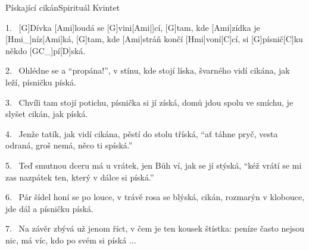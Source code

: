 %
\begin{song}{Pískající cikán}{Spirituál Kvintet}

\begin{xverse}{1.~}
[G]Dívka [Ami]loudá se [G]vini[Ami|]{cí,} [G]tam, kde [Ami]zídka je [Hmi_]{níz}[Ami]{ká},
[G]tam, kde [Ami]stráň končí [Hmi]voní[C]cí, si [G]písnič[C]ku někdo [GC_]{pí}[D]{ská}.
\end{xverse}

\begin{xverse}{2.~}
Ohlédne se a ``propána!'', v stínu, kde stojí líska,
švarného vidí cikána, jak leží, písničku píská.
\end{xverse}


\begin{xverse}{3.~}
Chvíli tam stojí potichu, písnička si jí získá,
domů jdou spolu ve smíchu, je slyšet cikán, jak píská.
\end{xverse}


\begin{xverse}{4.~}
Jenže tatík, jak vidí cikána, pěstí do stolu tříská,
``ať táhne pryč, vesta odraná, groš nemá, něco ti spíská.''
\end{xverse}


\begin{xverse}{5.~}
Teď smutnou dceru má u vrátek, jen Bůh ví, jak se jí stýská,
``kéž vrátí se mi zas nazpátek ten, který v dálce si píská.''
\end{xverse}


\begin{xverse}{6.~}
Pár šídel honí se po louce, v trávě rosa se blýská,
cikán, rozmarýn v klobouce, jde dál a písničku píská.
\end{xverse}


\begin{xverse}{7.~}
Na závěr zbývá už jenom říct, v čem je ten kousek štístka:
peníze často nejsou nic, má víc, kdo po svém si píská ...
\end{xverse}

\end{song}

